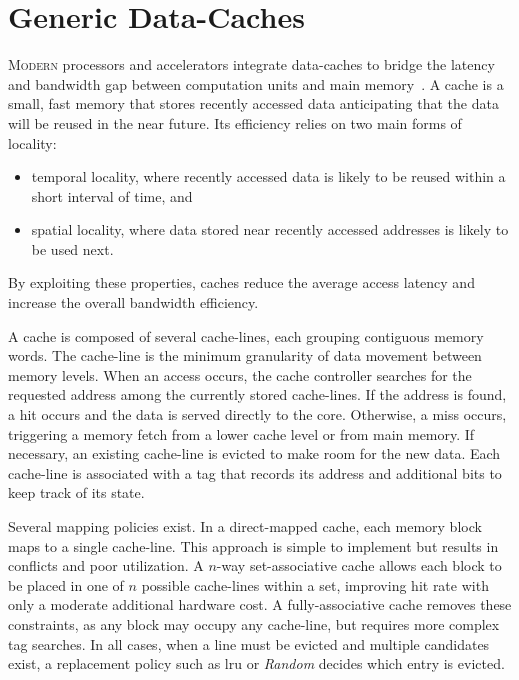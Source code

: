 
\section{Generic Data-Caches}
\label{sec:spdc:gc}

\lettrine{M}{odern} processors and accelerators integrate data-caches to bridge the latency and bandwidth gap between computation units and main memory~\cite{Hennessy2011_GC}.
A cache is a small, fast memory that stores recently accessed data anticipating that the data will be reused in the near future.
Its efficiency relies on two main forms of locality:
\begin{itemize}
\item temporal locality, where recently accessed data is likely to be reused within a short interval of time, and
\item spatial locality, where data stored near recently accessed addresses is likely to be used next.
\end{itemize}

\noindent
By exploiting these properties, caches reduce the average access latency and increase the overall bandwidth efficiency.

A cache is composed of several cache-lines, each grouping contiguous memory words.
The cache-line is the minimum granularity of data movement between memory levels.
When an access occurs, the cache controller searches for the requested address among the currently stored cache-lines.
If the address is found, a \gls{hit} occurs and the data is served directly to the core.
Otherwise, a \gls{miss} occurs, triggering a memory fetch from a lower cache level or from main memory.
If necessary, an existing cache-line is evicted to make room for the new data.
Each cache-line is associated with a \gls{tag} that records its address and additional bits to keep track of its state.

Several mapping policies exist.
In a direct-mapped cache, each memory block maps to a single cache-line.
This approach is simple to implement but results in conflicts and poor utilization.
A $n$-\gls{way} \gls{set}-associative cache allows each block to be placed in one of $n$ possible cache-lines within a \gls{set}, improving \gls{hit} rate with only a moderate additional hardware cost.
A fully-associative cache removes these constraints, as any block may occupy any cache-line, but requires more complex \gls{tag} searches.
In all cases, when a line must be evicted and multiple candidates exist, a replacement policy such as \acrfull{lru} or \emph{Random} decides which entry is evicted.

